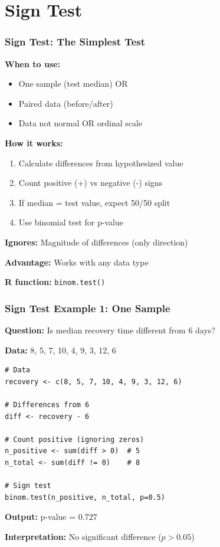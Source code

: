 \documentclass{beamer}
\begin{document}
\section{Sign Test}

\begin{frame}
\frametitle{Sign Test: The Simplest Test}
\textbf{When to use:}
\begin{itemize}
\item One sample (test median) OR
\item Paired data (before/after)
\item Data not normal OR ordinal scale
\end{itemize}

\vspace{0.5cm}
\textbf{How it works:}
\begin{enumerate}
\item Calculate differences from hypothesized value
\item Count positive (+) vs negative (-) signs
\item If median = test value, expect 50/50 split
\item Use binomial test for p-value
\end{enumerate}

\vspace{0.5cm}
\textbf{Ignores:} Magnitude of differences (only direction)

\textbf{Advantage:} Works with any data type

\textbf{R function:} \texttt{binom.test()}
\end{frame}

\begin{frame}[fragile]
\frametitle{Sign Test Example 1: One Sample}
\textbf{Question:} Is median recovery time different from 6 days?

\vspace{0.2cm}
\textbf{Data:} 8, 5, 7, 10, 4, 9, 3, 12, 6

\vspace{0.2cm}
\begin{footnotesize}
\begin{verbatim}
# Data
recovery <- c(8, 5, 7, 10, 4, 9, 3, 12, 6)

# Differences from 6
diff <- recovery - 6

# Count positive (ignoring zeros)
n_positive <- sum(diff > 0)  # 5
n_total <- sum(diff != 0)    # 8

# Sign test
binom.test(n_positive, n_total, p=0.5)
\end{verbatim}
\end{footnotesize}

\textbf{Output:} p-value = 0.727

\textbf{Interpretation:} No significant difference ($p > 0.05$)
\end{frame}
\end{document}
